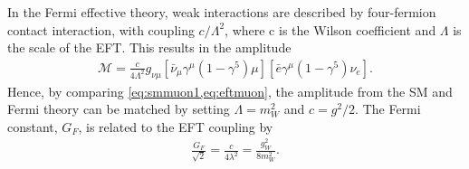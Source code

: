 In the Fermi effective theory, weak interactions are described by four-fermion contact interaction, with coupling $c/\Lambda^2$, where c is the Wilson coefficient and $\Lambda$ is the scale of the EFT. This results in the amplitude
\begin{equation}
    \label{eq:eftmuon}
    \begin{aligned}
        \mathcal{M} =  \frac{c}{4\Lambda^2}g_{\nu\mu}
        [\bar{\nu}_\mu\gamma^\mu(1-\gamma^5)\mu]
        [\bar{e}\gamma^\mu(1-\gamma^5)\nu_e].
     \end{aligned}
\end{equation}
Hence, by comparing \cref{eq:smmuon1,eq:eftmuon}, the amplitude from the SM and Fermi theory can be matched by setting $\Lambda = m_W^2$ and $ c = g^2/2$. The Fermi constant, $G_F$, is related to the EFT coupling by 
\begin{equation}
    \label{eq:fermiconstant}
    \begin{aligned}
        \frac{G_F}{\sqrt{2}} = \frac{c}{4\lambda^2} = \frac{g_W^2}{8m_W^2}. 
     \end{aligned}
\end{equation}

